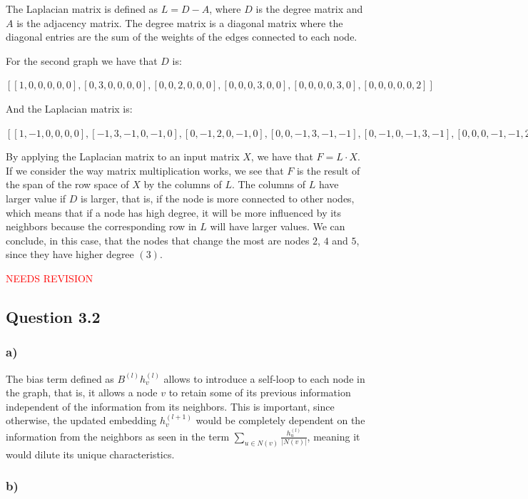 \documentclass{article}
\begin{document}
The Laplacian matrix is defined as $L = D - A$, where $D$ is the degree matrix and $A$ is the adjacency matrix.
The degree matrix is a diagonal matrix where the diagonal entries are the sum of the weights of the edges connected to each node.

For the second graph we have that $D$ is:

$[
[1, 0, 0, 0, 0, 0],
[0, 3, 0, 0, 0, 0],
[0, 0, 2, 0, 0, 0],
[0, 0, 0, 3, 0, 0],
[0, 0, 0, 0, 3, 0],
[0, 0, 0, 0, 0, 2]]$

And the Laplacian matrix is:

$[
[1, -1,  0, 0, 0, 0],
[-1, 3, -1, 0, -1, 0],
[0, -1,  2, 0, -1, 0],
[0, 0,  -1, 3, -1, -1],
[0, -1,  0, -1, 3, -1],
[0, 0,   0, -1, -1, 2]]$

By applying the Laplacian matrix to an input matrix $X$, we have that $F = L \cdot X$. 
If we consider the way matrix multiplication works, we see that $F$ is the result of the span of the row space of $X$ by the columns of $L$.
The columns of $L$ have larger value if $D$ is larger, that is, if the node is more connected to other nodes, which means that
if a node has high degree, it will be more influenced by its neighbors because the corresponding row in $L$ will have larger values.
We can conclude, in this case, that the nodes that change the most are nodes $2$, $4$ and $5$, since they have higher degree $(3)$.

\textcolor{red}{NEEDS REVISION}

\subsection*{Question 3.2}

\subsubsection*{a)}

The bias term defined as $B^{(l)}h_v^{(l)}$ allows to introduce a self-loop to each node in the graph, that is, it allows
a node $v$ to retain some of its previous information independent of the information from its neighbors. This is important,
since otherwise, the updated embedding $h_v^{(l+1)}$ would be completely dependent on the information from the neighbors
as seen in the term $\sum_{u \in N(v)} \frac{h_u^{(l)}}{|N(v)|}$, meaning it would dilute its unique characteristics.

\subsubsection*{b)}
\end{document}
